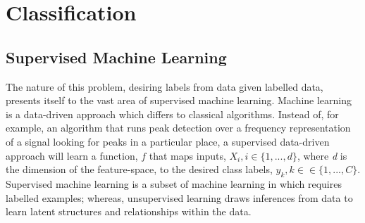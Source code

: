 \section{Classification}
\label{sec:pl-clf}

    \subsection{Supervised Machine Learning}
    \label{subsec:pl-clf-sup}
        The nature of this problem, desiring labels from data given labelled data, presents itself to the vast area of supervised machine learning. Machine learning is a data-driven approach which differs to classical algorithms. Instead of, for example, an algorithm that runs peak detection over a frequency representation of a signal looking for peaks in a particular place, a supervised data-driven approach will learn a function, $f$ that maps inputs, $X_i, i\in\{1,...,d\}$, where \textit{d} is the dimension of the feature-space, to the desired class labels, $y_k,k\in\in\{1,...,C\}$. Supervised machine learning is a subset of machine learning in which requires labelled examples; whereas, unsupervised learning draws inferences from data to learn latent structures and relationships within the data.
        
